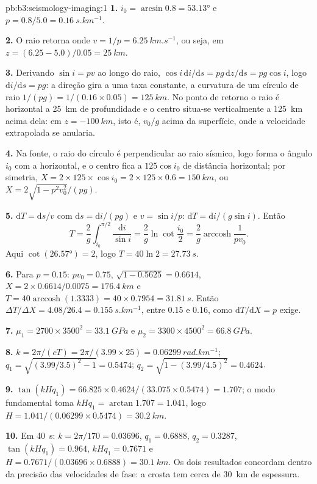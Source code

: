 \begin{solution}{pb:b3:seismology-imaging:1}
\textbf{1.} $i_0 = \arcsin 0.8 = \ang{53.13}$ e $p = 0.8/5.0 =
\qty{0.16}{s.km^{-1}}$.

\textbf{2.} O raio retorna onde $v = 1/p = \qty{6.25}{km.s^{-1}}$, ou seja, em
$z = (6.25 - 5.0)/0.05 = \qty{25}{km}$.

\textbf{3.} Derivando $\sin i = pv$ ao longo do raio, $\cos i\,\mathrm di/
\mathrm ds = pg\,\mathrm dz/\mathrm ds = pg\cos i$, logo $\mathrm di/\mathrm ds =
pg$: a direção gira a uma taxa constante, a curvatura de um círculo de raio
$1/(pg) = 1/(0.16\times0.05) = \qty{125}{km}$. No ponto de retorno o raio é
horizontal a \qty{25}{km} de profundidade e o centro situa-se verticalmente a \qty{125}{km}
acima dela: em $z = \qty{-100}{km}$, isto é, $v_0/g$ acima da superfície, onde a
velocidade extrapolada se anularia.

\textbf{4.} Na fonte, o raio do círculo é perpendicular ao raio sísmico,
logo forma o ângulo $i_0$ com a horizontal, e o centro fica a
$125\cos i_0$ de distância horizontal; por simetria,
$X = 2\times125\times\cos i_0 = 2\times125\times0.6 = \qty{150}{km}$, ou
$X = 2\sqrt{1 - p^2v_0^2}/(pg)$.

\textbf{5.} $\mathrm dT = \mathrm ds/v$ com $\mathrm ds = \mathrm di/(pg)$ e
$v = \sin i/p$: $\mathrm dT = \mathrm di/(g\sin i)$. Então
\[
  T = \frac2g\int_{i_0}^{\pi/2}\frac{\mathrm di}{\sin i} = \frac2g\ln\cot\frac{i_0}2 =
  \frac2g\operatorname{arccosh}\frac1{pv_0} .
\]
Aqui $\cot(\ang{26.57}) = 2$, logo
$T = 40\ln2 = \qty{27.73}{s}$.

\textbf{6.} Para $p = 0.15$: $pv_0 = 0.75$, $\sqrt{1 - 0.5625} = 0.6614$,
$X = 2\times0.6614/0.0075 = \qty{176.4}{km}$ e $T = 40\operatorname{arccosh}
(1.3333) = 40\times0.7954 = \qty{31.81}{s}$. Então $\Delta T/\Delta X =
4.08/26.4 = \qty{0.155}{s.km^{-1}}$, entre 0.15 e 0.16, como
$\mathrm dT/\mathrm dX = p$ exige.

\textbf{7.} $\mu_1 = 2700\times3500^2 = \qty{33.1}{GPa}$ e
$\mu_2 = 3300\times4500^2 = \qty{66.8}{GPa}$.

\textbf{8.} $k = 2\pi/(cT) = 2\pi/(3.99\times25) = \qty{0.06299}{rad.km^{-1}}$;
$q_1 = \sqrt{(3.99/3.5)^2 - 1} = 0.5474$; $q_2 = \sqrt{1 - (3.99/4.5)^2} = 0.4624$.

\textbf{9.} $\tan(kHq_1) = 66.825\times0.4624/(33.075\times0.5474) = 1.707$; o
modo fundamental toma $kHq_1 = \arctan1.707 = 1.041$, logo
$H = 1.041/(0.06299\times0.5474) = \qty{30.2}{km}$.

\textbf{10.} Em \qty{40}{s}: $k = 2\pi/170 = 0.03696$, $q_1 = 0.6888$,
$q_2 = 0.3287$, $\tan(kHq_1) = 0.964$, $kHq_1 = 0.7671$ e
$H = 0.7671/(0.03696\times0.6888) = \qty{30.1}{km}$. Os dois resultados concordam dentro da
precisão das velocidades de fase: a crosta tem cerca de \qty{30}{km} de espessura.


\end{solution}
